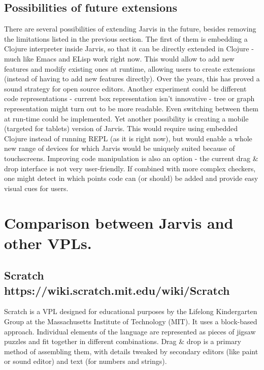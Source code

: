 \documentclass[11pt]{scrartcl}
\begin{document}
\subsection{Possibilities of future extensions}
There are several possibilities of extending Jarvis in the future, besides removing the limitations listed in the previous section. The first of them is embedding a Clojure interpreter inside Jarvis, so that it can be directly extended in Clojure - much like Emacs and ELisp work right now. This would allow to add new features and modify existing ones at runtime, allowing users to create extensions (instead of having to add new features directly). Over the years, this has proved a sound strategy for open source editors. Another experiment could be different code representations - current box representation isn’t innovative - tree or graph representation might turn out to be more readable. Even switching between them at run-time could be implemented. Yet another possibility is creating a mobile (targeted for tablets) version of Jarvis. This would require using embedded Clojure instead of running REPL (as it is right now), but would enable a whole new range of devices for which Jarvis would be uniquely suited because of touchscreens. Improving code manipulation is also an option - the current drag \& drop interface is not very user-friendly. If combined with more complex checkers, one might detect in which points code can (or should) be added and provide easy visual cues for users.

\section{Comparison between Jarvis and other VPLs.}
\subsection{Scratch {https://wiki.scratch.mit.edu/wiki/Scratch}}
Scratch is a VPL designed for educational purposes by the Lifelong Kindergarten Group at the Massachusetts Institute of Technology (MIT). It uses a block-based approach. Individual elements of the language are represented as pieces of jigsaw puzzles and fit together in different combinations. Drag \& drop is a primary method of assembling them, with details tweaked by secondary editors (like paint or sound editor) and text (for numbers and strings).
\end{document}
